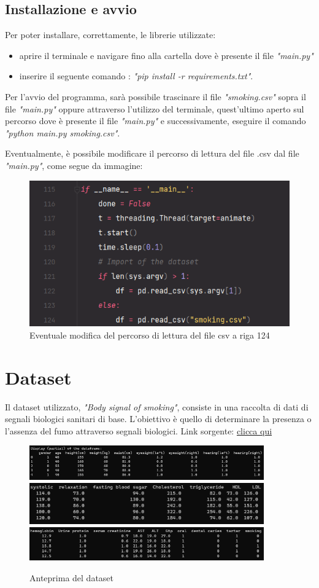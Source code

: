 \documentclass{article}
\begin{document}
\subsection{Installazione e avvio}

Per poter installare, correttamente, le librerie utilizzate:
\begin{itemize}
    \item aprire il terminale e navigare fino alla cartella dove è presente il file \textit{"main.py"}
    \item inserire il seguente comando : \textit{"pip install -r requirements.txt"}.
\end{itemize}
%
Per l'avvio del programma, sarà possibile trascinare il file \textit{"smoking.csv"} sopra il file \textit{"main.py"} oppure attraverso l'utilizzo del terminale, quest'ultimo aperto sul percorso dove è presente il file \textit{"main.py"} e successivamente, eseguire il comando \textit{"python main.py smoking.csv"}.
%

\noindent
Eventualmente, è possibile modificare il percorso di lettura del file .csv dal file \textit{"main.py"}, come segue da immagine:

\begin{figure}[H]
        \includegraphics [width=0.8 cm + \textwidth]{modify}
        \centering
        \caption{Eventuale modifica del percorso di lettura del file csv a riga 124}
        \centering
\end{figure}

\section{Dataset}

Il dataset utilizzato, \textit{"Body signal of smoking"}, consiste in una raccolta di dati di segnali biologici sanitari di base. 
%
L'obiettivo è quello di determinare la presenza o l'assenza del fumo attraverso segnali biologici.
%
Link sorgente: \href{https://www.kaggle.com/datasets/kukuroo3/body-signal-of-smoking}{clicca qui}

\begin{figure}[H]
        \includegraphics[width=0.9\textwidth]{display 1}
        \includegraphics[width=0.9\textwidth]{display 2}
        \includegraphics[width=0.9\textwidth]{display 3}
        \centering
        \caption{Anteprima del dataset}
        \centering
\end{figure}
\end{document}
